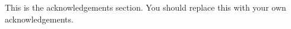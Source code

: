 \section*{}

This is the acknowledgements section.  You should replace this with your
own acknowledgements.

